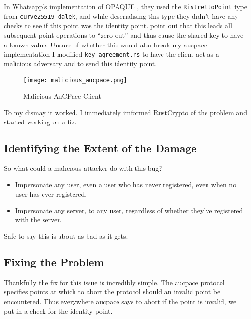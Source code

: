 In Whatsapp's implementation of OPAQUE \cite{opaque}, they used the \texttt{RistrettoPoint} type from \texttt{curve25519-dalek}, and while deserialising this type they didn't have any checks to see if this point was the identity point.
 point out that this leads all subsequent point operations to \enquote{zero out} and thus cause the shared key to have a known value.
Unsure of whether this would also break my \gls{aucpace} implementation I modified \texttt{key\_agreement.rs} to have the client act as a malicious adversary and to send this identity point.


\begin{figure}[H]
  \centering

  \texttt{[image: malicious\_aucpace.png]}
  \caption{Malicious AuCPace Client}
  \label{fig:break-everything}
\end{figure}

To my dismay it worked.
I immediately imformed RustCrypto of the problem and started working on a fix.

\subsection{Identifying the Extent of the Damage}
So what could a malicious attacker do with this bug?

\begin{itemize}
  \item{Impersonate any user, even a user who has never registered, even when no user has ever registered.}
  \item{Impersonate any server, to any user, regardless of whether they've registered with the server.}
\end{itemize}

Safe to say this is about as bad as it gets.

\subsection{Fixing the Problem}
Thankfully the fix for this issue is incredibly simple.
The \gls{aucpace} protocol specifies points at which to abort the protocol should an invalid point be encountered.
Thus everywhere \gls{aucpace} says to abort if the point is invalid, we put in a check for the identity point.


